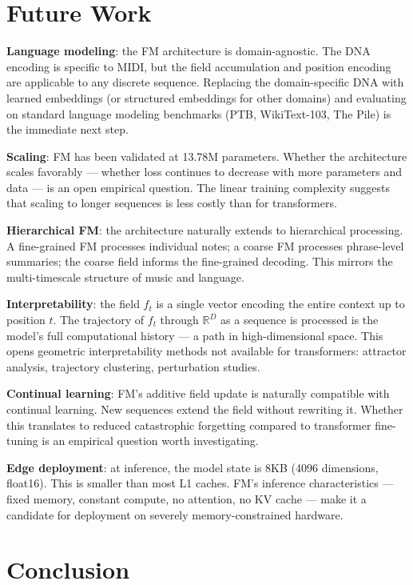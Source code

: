 \documentclass[11pt]{article}
\begin{document}
\section{Future Work}

\textbf{Language modeling}: the FM architecture is domain-agnostic. The DNA encoding is specific to MIDI, but the field accumulation and position encoding are applicable to any discrete sequence. Replacing the domain-specific DNA with learned embeddings (or structured embeddings for other domains) and evaluating on standard language modeling benchmarks (PTB, WikiText-103, The Pile) is the immediate next step.

\textbf{Scaling}: FM has been validated at 13.78M parameters. Whether the architecture scales favorably — whether loss continues to decrease with more parameters and data — is an open empirical question. The linear training complexity suggests that scaling to longer sequences is less costly than for transformers.

\textbf{Hierarchical FM}: the architecture naturally extends to hierarchical processing. A fine-grained FM processes individual notes; a coarse FM processes phrase-level summaries; the coarse field informs the fine-grained decoding. This mirrors the multi-timescale structure of music and language.

\textbf{Interpretability}: the field $f_t$ is a single vector encoding the entire context up to position $t$. The trajectory of $f_t$ through $\mathbb{R}^D$ as a sequence is processed is the model's full computational history — a path in high-dimensional space. This opens geometric interpretability methods not available for transformers: attractor analysis, trajectory clustering, perturbation studies.

\textbf{Continual learning}: FM's additive field update is naturally compatible with continual learning. New sequences extend the field without rewriting it. Whether this translates to reduced catastrophic forgetting compared to transformer fine-tuning is an empirical question worth investigating.

\textbf{Edge deployment}: at inference, the model state is 8KB (4096 dimensions, float16). This is smaller than most L1 caches. FM's inference characteristics — fixed memory, constant compute, no attention, no KV cache — make it a candidate for deployment on severely memory-constrained hardware.

\section{Conclusion}
\end{document}
